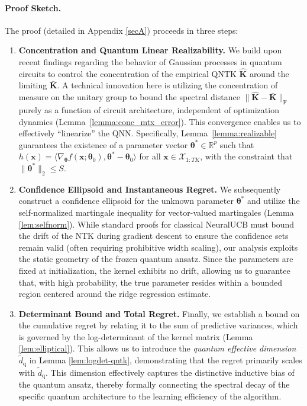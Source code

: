\documentclass[pdflatex,sn-mathphys-num]{sn-jnl}%
\theoremstyle{thmstyleone}%
\theoremstyle{thmstyletwo}%
\theoremstyle{thmstylethree}%
\newcommand{\xbf}{\mathbf{x}}
\newcommand{\Kbf}{\mathbf{K}}
\newcommand{\thetabf}{\bm{\theta}}
\begin{document}
\paragraph{Proof Sketch.} 
The proof (detailed in Appendix \ref{secA}) proceeds in three steps:
\begin{enumerate}

\item \textbf{Concentration and Quantum Linear Realizability.} We build upon recent findings regarding the behavior of Gaussian processes in quantum circuits \cite{Girardi2025} to control the concentration of the empirical QNTK $\hat{\Kbf}$ around the limiting $\bar{\Kbf}$. 
A technical innovation here is utilizing the concentration of measure on the unitary group  to bound the spectral distance $\|\hat{\Kbf} - \bar{\Kbf}\|_{\mathrm{F}}$ purely as a function of circuit architecture, independent of optimization dynamics (Lemma~\ref{lemma:conc_mtx_error}).
This convergence enables us to effectively ``linearize'' the QNN. %
Specifically, Lemma~\ref{lemma:realizable} guarantees the existence of a parameter vector $\bm{\theta}^* \in \mathbb{R}^p$ such that $h(\xbf)= \langle \nabla_{\thetabf}f(\xbf;\thetabf_0),\thetabf^*-\thetabf_0\rangle$ for all $\xbf \in \mathcal{X}_{1:TK}$, with the constraint that $\|\bm{\theta}^*\|_2 \le S$. 

\item \textbf{Confidence Ellipsoid and Instantaneous Regret.} 
We subsequently construct a confidence ellipsoid for the unknown parameter $\bm{\theta}^*$ and utilize the self-normalized martingale inequality for vector-valued martingales (Lemma \ref{lem:selfnorm}). 
While standard proofs for  classical NeuralUCB \cite{neuralucb} must bound the drift of the NTK during gradient descent to ensure the confidence sets remain valid (often requiring prohibitive width scaling), our analysis exploits the static geometry of the frozen quantum ansatz. Since the parameters are fixed at initialization, the kernel exhibits no drift, allowing us to guarantee that,  
with high probability, the true parameter resides within a bounded region centered around the ridge regression estimate.


\item \textbf{Determinant Bound and Total Regret.} Finally, we establish a bound on the cumulative regret by relating it to the sum of predictive variances, which is governed by the log-determinant of the kernel matrix (Lemma \ref{lem:elliptical}). This allows us to introduce  the \emph{quantum effective dimension} $\widetilde{d}_{\mathrm{q}}$  in Lemma \ref{lem:logdet-qntk}, demonstrating that the regret primarily scales with $\widetilde{d}_{\mathrm{q}}$. This dimension effectively captures the distinctive inductive bias of the quantum ansatz, thereby formally connecting the spectral decay of the specific quantum architecture to the learning efficiency of the algorithm.
\end{enumerate}
\end{document}
